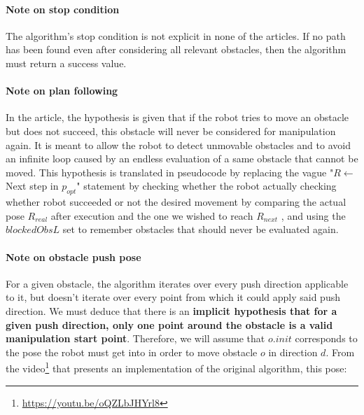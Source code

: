 \paragraph{Note on stop condition}\label{stop_condition_note} The algorithm's stop condition is not explicit in none of the articles. If no path has been found even after considering all relevant obstacles, then the algorithm must return a success value.

\paragraph{Note on plan following}\label{plan_following_note} In the article, the hypothesis is given that if the robot tries to move an obstacle but does not succeed, this obstacle will never be considered for manipulation again. It is meant to allow the robot to detect unmovable obstacles and to avoid an infinite loop caused by an endless evaluation of a same obstacle that cannot be moved. This hypothesis is translated in pseudocode by replacing the vague "$R \gets$ Next step in $p_{opt}$" statement by checking whether the robot actually checking whether robot succeeded or not the desired movement by comparing the actual pose $R_{real}$ after execution and the one we wished to reach $R_{next}$ , and using the $blockedObsL$ set to remember obstacles that should never be evaluated again.

\paragraph{Note on obstacle push pose}\label{obstacle_pushpose_note} For a given obstacle, the algorithm iterates over every push direction applicable to it, but doesn't iterate over every point from which it could apply said push direction. We must deduce that there is an \textbf{implicit hypothesis that for a given push direction, only one point around the obstacle is a valid manipulation start point}. Therefore, we will assume that $o.init$ corresponds to the pose the robot must get into in order to move obstacle $o$ in direction $d$. From the video\footnote{\url{https://youtu.be/oQZLbJHYrl8}} that presents an implementation of the original algorithm, this pose:

